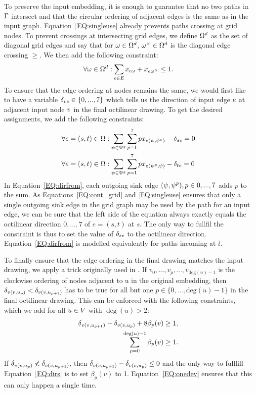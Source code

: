 \documentclass[sigconf]{acmart}
\begin{document}
To preserve the input embedding, it is enough to guarantee that no two paths in $\Gamma$ intersect and that the circular ordering of adjacent edges is the same as in the input graph.
Equation~\ref{EQ:singleuse} already prevents paths crossing at grid nodes.
To prevent crossings at intersecting grid edges, we define $\Omega^d$ as the set of diagonal grid edges and say that for $\omega \in \Omega^d$, $\omega^{\times} \in \Omega^d$ is the diagonal edge crossing $\ge$. 
We then add the following constraint:
%
\begin{equation}
  \forall \ge \in \gE^d: \Psum{\ie \in \iE} \geused{\ie}{\ge} + \geused{\ie}{\ge^{\times}} \leq 1. \label{EQ:crossing}
\end{equation}
%
To ensure that the edge ordering at nodes remains the same, we would first like to have a variable $\delta_{ve} \in \{0, ..., 7\}$ which tells us the direction of input edge $e$ at adjacent input node $v$ in the final octilinear drawing.
To get the desired assignments, we add the following constraints:
%
\begin{align}
  \forall e = (s, t) \in \Omega&: \sum_{\psi \in \Psi^g} \sum_{p = 1}^7 p x_{e(\psi,  \psi^p)} - \delta_{se} = 0\label{EQ:dirfrom} \\
  \forall e = (s, t) \in \Omega&: \sum_{\psi \in \Psi^g} \sum_{p = 1}^7 p x_{e(\psi^p, \psi)} - \delta_{te} = 0\label{EQ:dirto}
\end{align}
%
In Equation~\ref{EQ:dirfrom}, each outgoing sink edge $(\psi,  \psi^{p}), p \in {0, ..., 7}$ adds $p$ to the sum.
As Equations~\ref{EQ:cont_grid} and \ref{EQ:singleuse} ensures that only a single outgoing sink edge in the grid graph may be used by the path for an input edge, we can be sure that the left side of the equation always exactly equals the octilinear direction $0, ..., 7$ of $e = (s, t)$ at $s$.
The only way to fullfil the constraint is thus to set the value of $\delta_{se}$ to the octilinear direction.
Equation~\ref{EQ:dirfrom} is modelled equivalently for paths incoming at $t$.

To finally ensure that the edge ordering in the final drawing matches the input drawing, we apply a trick originally used in \cite{noellenburg}.
If $v_0, ..., v_p, ..., v_{\text{deg}(u) - 1}$ is the clockwise ordering of nodes adjacent to u in the original embedding, then $\delta_{v(v, u_{p})} < \delta_{v(v, u_{p + 1})}$ has to be true for all but one $p \in \{0, ..., \text{deg}(u) - 1\}$ in the final octilinear drawing.
This can be enforced with the following constraints, which we add for all  $u \in V$ with $\deg(u) > 2$:
%
\begin{align}
  \delta_{v(v, u_{p + 1})} - \delta_{v(v, u_{p})} + 8\beta_p(v) &\geq 1,\label{EQ:dirs}\\
  \sum_{p = 0}^{\deg(u)-1} \beta_p(v) &\geq 1\label{EQ:onedev}.
\end{align}
%
If $\delta_{v(v, u_{p})} \not< \delta_{v(v, u_{p + 1})}$, then $\delta_{v(v, u_{p + 1})} - \delta_{v(v, u_{p})} \leq 0$ and the only way to fullfill Equation~\ref{EQ:dirs} is to set $\beta_p(v)$ to 1.
Equation~\ref{EQ:onedev} ensures that this can only happen a single time.
\end{document}
